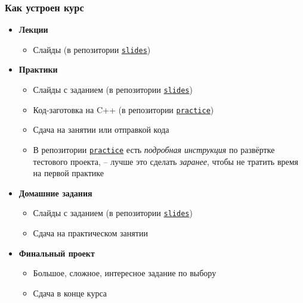 \documentclass[10pt]{beamer}
\begin{document}
\begin{frame}
\frametitle{Как устроен курс}
\begin{itemize}
\item \textbf{Лекции}
\begin{itemize}
\item Слайды (в репозитории \href{https://github.com/lisyarus/graphics-course-slides/tree/master/pdf}{\nolinkurl{slides}})
\end{itemize}
\pause
\item \textbf{Практики}
\pause
\begin{itemize}
\item Слайды с заданием (в репозитории \href{https://github.com/lisyarus/graphics-course-slides/tree/master/pdf}{\nolinkurl{slides}})
\pause
\item Код-заготовка на C++ (в репозитории \href{https://github.com/lisyarus/graphics-course-practice/tree/master/pdf}{\nolinkurl{practice}})
\pause
\item Сдача на занятии или отправкой кода
\pause
\item В репозитории \href{https://github.com/lisyarus/graphics-course-practice/tree/master/pdf}{\nolinkurl{practice}} есть \textit{подробная инструкция} по развёртке тестового проекта, -- лучше это сделать \textit{заранее}, чтобы не тратить время на первой практике
\end{itemize}
\pause
\item \textbf{Домашние задания}
\pause
\begin{itemize}
\item Слайды с заданием (в репозитории \href{https://github.com/lisyarus/graphics-course-slides/tree/master/pdf}{\nolinkurl{slides}})
\pause
\item Сдача на практическом занятии
\end{itemize}
\pause
\item \textbf{Финальный проект}
\begin{itemize}
\item Большое, сложное, интересное задание по выбору
\pause
\item Сдача в конце курса
\end{itemize}
\end{itemize}
\end{frame}
\end{document}

